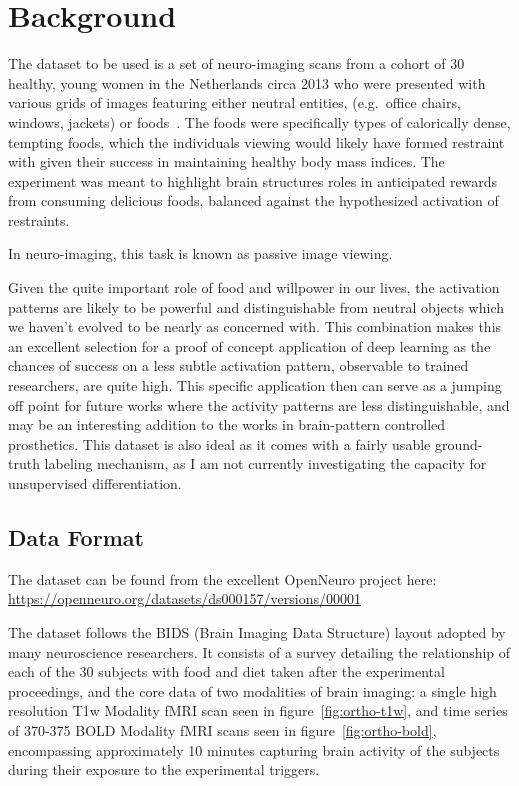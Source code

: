 \section{Background}\label{sec:background}

The dataset to be used is a set of neuro-imaging scans from a cohort of 30 healthy, young women in the
Netherlands circa 2013 who were presented with various grids of images featuring
either neutral entities, (e.g.\ office chairs, windows, jackets) or foods~\cite{smeets2013allured}.
The foods were specifically types of calorically dense, tempting foods, which the individuals viewing would likely
have formed restraint with given their success in maintaining healthy body mass indices.
The experiment was meant to highlight brain structures roles in anticipated rewards from consuming delicious foods,
balanced against the hypothesized activation of restraints.

In neuro-imaging, this task is known as passive image viewing.

Given the quite important role of food and willpower in our lives, the activation patterns are likely to be powerful
and distinguishable from neutral objects which we haven't evolved to be nearly as concerned with.
This combination makes this an excellent selection for a proof of concept application of deep learning as the chances
of success on a less subtle activation pattern, observable to trained researchers, are quite high.
This specific application then can serve as a jumping off point for future works where the activity patterns are less
distinguishable, and may be an interesting addition to the works in brain-pattern controlled prosthetics.
This dataset is also ideal as it comes with a fairly usable ground-truth labeling mechanism, as I am not currently
investigating the capacity for unsupervised differentiation.

\subsection{Data Format}\label{subsec:data-format}

The dataset can be found from the excellent
OpenNeuro project here: \url{https://openneuro.org/datasets/ds000157/versions/00001}

The dataset follows the BIDS (Brain Imaging Data Structure) layout adopted by many neuroscience researchers.
It consists of a survey detailing the relationship of each of the 30 subjects with food and diet taken after the experimental
proceedings, and the core data of two modalities of brain imaging: a single high resolution T1w Modality fMRI scan seen in figure~\ref{fig:ortho-t1w},
and time series of 370-375 BOLD Modality fMRI scans seen in figure~\ref{fig:ortho-bold}, encompassing approximately 10 minutes
capturing brain activity of the subjects during their exposure to the experimental triggers.

